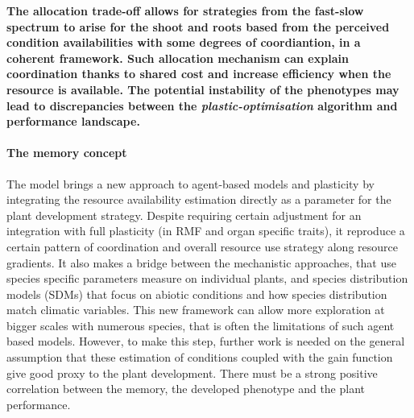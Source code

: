 





\textbf{The allocation trade-off allows for strategies from the fast-slow spectrum to arise for the shoot and roots based from the perceived condition availabilities with some degrees of coordiantion, in a coherent framework. Such allocation mechanism can explain coordination thanks to shared cost and increase efficiency when the resource is available. The potential instability of the phenotypes may lead to discrepancies between the \textit{plastic-optimisation} algorithm and performance landscape. }

\paragraph{The memory concept}

The model \model brings a new approach to agent-based models and plasticity by integrating the resource availability estimation directly as a parameter for the plant development strategy. Despite requiring certain adjustment for an integration with full plasticity (in RMF and organ specific traits), it reproduce a certain pattern of coordination and overall resource use strategy along resource gradients. It also makes a bridge between the mechanistic approaches, that use species specific parameters measure on individual plants, and species distribution models (SDMs) that focus on abiotic conditions  and how species distribution match climatic variables. This new framework can allow more exploration at bigger scales with numerous species, that is often the limitations of such agent based models. However, to make this step, further work is needed on the general assumption that these estimation of conditions coupled with the gain function give good proxy to the plant development. There must be a strong positive correlation between the memory, the developed phenotype and the plant performance. 

